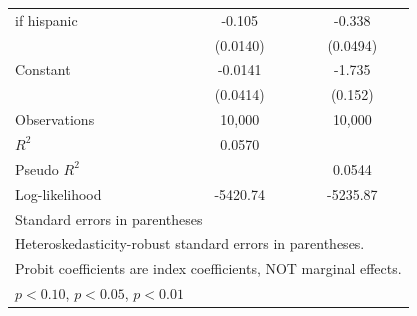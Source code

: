 \begin{table}[H]
\begin{tabular}{l*{2}{c}}
\addlinespace
=1 if hispanic      &      -0.105\sym{***}&      -0.338\sym{***}\\
                    &    (0.0140)         &    (0.0494)         \\
\addlinespace
Constant            &     -0.0141         &      -1.735\sym{***}\\
                    &    (0.0414)         &     (0.152)         \\
\midrule
Observations        &      10,000         &      10,000         \\
$R^2$               &      0.0570         &                     \\
Pseudo $R^2$        &                     &      0.0544         \\
Log-likelihood      &    -5420.74         &    -5235.87         \\
\bottomrule
\multicolumn{3}{l}{\footnotesize Standard errors in parentheses}\\
\multicolumn{3}{l}{\footnotesize Heteroskedasticity-robust standard errors in parentheses.}\\
\multicolumn{3}{l}{\footnotesize Probit coefficients are index coefficients, NOT marginal effects.}\\
\multicolumn{3}{l}{\footnotesize \sym{*} \(p<0.10\), \sym{**} \(p<0.05\), \sym{***} \(p<0.01\)}\\
\end{tabular}
\end{table}
